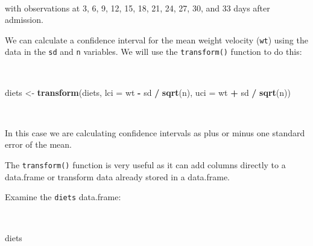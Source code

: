 \documentclass[12pt,a4paper]{book}
\newenvironment{Shaded}{\begin{snugshade}}{\end{snugshade}}
\newcommand{\DataTypeTok}[1]{\textcolor[rgb]{0.13,0.29,0.53}{#1}}
\newcommand{\KeywordTok}[1]{\textcolor[rgb]{0.13,0.29,0.53}{\textbf{#1}}}
\newcommand{\NormalTok}[1]{#1}
\newcommand{\OperatorTok}[1]{\textcolor[rgb]{0.81,0.36,0.00}{\textbf{#1}}}
\newcommand{\StringTok}[1]{\textcolor[rgb]{0.31,0.60,0.02}{#1}}
\theoremstyle{definition}
\theoremstyle{definition}
\theoremstyle{definition}
\theoremstyle{remark}
\begin{document}
~

with observations at 3, 6, 9, 12, 15, 18, 21, 24, 27, 30, and 33 days
after admission.

We can calculate a confidence interval for the mean weight velocity
(\texttt{wt}) using the data in the \texttt{sd} and \texttt{n}
variables. We will use the \texttt{transform()} function to do this:

~

\begin{Shaded}
\begin{Highlighting}[]
\NormalTok{diets <-}\StringTok{ }\KeywordTok{transform}\NormalTok{(diets, }\DataTypeTok{lci =}\NormalTok{ wt }\OperatorTok{-}\StringTok{ }\NormalTok{sd }\OperatorTok{/}\StringTok{ }\KeywordTok{sqrt}\NormalTok{(n), }\DataTypeTok{uci =}\NormalTok{ wt }\OperatorTok{+}\StringTok{ }\NormalTok{sd }\OperatorTok{/}\StringTok{ }\KeywordTok{sqrt}\NormalTok{(n))}
\end{Highlighting}
\end{Shaded}

~

In this case we are calculating confidence intervals as plus or minus
one standard error of the mean.

The \texttt{transform()} function is very useful as it can add columns
directly to a data.frame or transform data already stored in a
data.frame.

\newpage

Examine the \texttt{diets} data.frame:

~

\begin{Shaded}
\begin{Highlighting}[]
\NormalTok{diets}
\end{Highlighting}
\end{Shaded}
\end{document}
